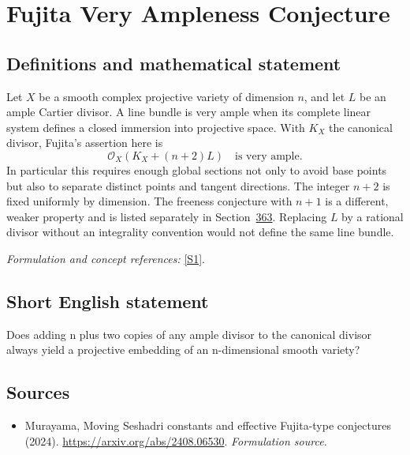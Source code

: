 \documentclass[11pt]{article}
\begin{document}
\section*{\texorpdfstring{Fujita Very Ampleness Conjecture}{Fujita Very Ampleness Conjecture}}\label{466}
\subsection{Definitions and mathematical statement}
Let $X$ be a smooth complex projective variety of dimension $n$, and let $L$ be an ample Cartier divisor. A line bundle is very ample when its complete linear system defines a closed immersion into projective space. With $K_X$ the canonical divisor, Fujita's assertion here is
\[
 \mathcal O_X(K_X+(n+2)L)\quad\text{is very ample}.
\]
In particular this requires enough global sections not only to avoid base points but also to separate distinct points and tangent directions. The integer $n+2$ is fixed uniformly by dimension. The freeness conjecture with $n+1$ is a different, weaker property and is listed separately in Section~\href{https://mehmetmars7.github.io/Erdosproblems-llm-hunter/problem.html?type=open_problems&id=problem.fujita-freeness-conjecture}{363}. Replacing $L$ by a rational divisor without an integrality convention would not define the same line bundle.
\par\smallskip\textit{Formulation and concept references:} \href{https://arxiv.org/abs/2408.06530}{[S1]}.

\subsection{Short English statement}
Does adding n plus two copies of any ample divisor to the canonical divisor always yield a projective embedding of an n-dimensional smooth variety?
\subsection{Sources}
\begin{itemize}
\item[S1]Murayama, Moving Seshadri constants and effective Fujita-type conjectures (2024).
\url{https://arxiv.org/abs/2408.06530}.
\textit{Formulation source.}
\end{itemize}
\end{document}
